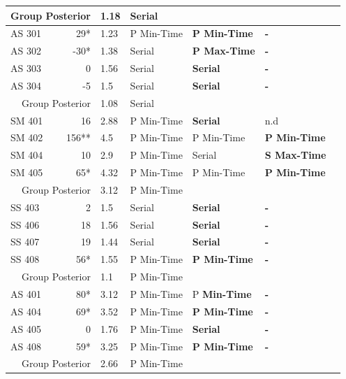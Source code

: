 \begin{table}[!htb]
\begin{tabular*}{\textwidth}{l @{\extracolsep{\fill}} rlllll}
\multicolumn{2}{r}{Group Posterior} & 1.18 & Serial & ~ & ~ \\
\hline
AS 301  & 29*  & 1.23 & P Min-Time  & \textbf{P Min-Time} & \textbf{ - } \\
AS 302  & -30* & 1.38 & Serial  & \textbf{P Max-Time} & \textbf{ - } \\
AS 303  & 0  & 1.56 & Serial  & \textbf{Serial} & \textbf{ - } \\
AS 304  & -5  & 1.5 & Serial  & \textbf{Serial} & \textbf{ - } \\
\multicolumn{2}{r}{Group Posterior} & 1.08 & Serial & ~ & ~ \\
\hline
SM 401  & 16  & 2.88 & P Min-Time  & \textbf{Serial} & n.d \\
SM 402  & 156**  & 4.5 & P Min-Time  & P Min-Time & \textbf{P Min-Time} \\
SM 404  & 10  & 2.9 & P Min-Time  & Serial & \textbf{S Max-Time} \\
SM 405  & 65*  & 4.32 & P Min-Time  & P Min-Time & \textbf{P Min-Time} \\
\multicolumn{2}{r}{Group Posterior} & 3.12 & P Min-Time & ~ & ~\\
\hline
SS 403  & 2  & 1.5 & Serial  & \textbf{Serial} & \textbf{ - } \\
SS 406  & 18  & 1.56 & Serial  & \textbf{Serial} & \textbf{ - } \\
SS 407  & 19  & 1.44 & Serial  & \textbf{Serial} & \textbf{ - } \\
SS 408  & 56*  & 1.55 & P Min-Time  & \textbf{P Min-Time} & \textbf{ - } \\
\multicolumn{2}{r}{Group Posterior} & 1.1 & P Min-Time & ~ & ~\\
\hline
AS 401  & 80*  & 3.12 & P Min-Time  & P \textbf{Min-Time} & \textbf{ - } \\
AS 404  & 69*  & 3.52 & P Min-Time  & \textbf{P Min-Time} & \textbf{ - } \\
AS 405  & 0  & 1.76 & P Min-Time  & \textbf{Serial} & \textbf{ - } \\
AS 408  & 59*  & 3.25 & P Min-Time  & \textbf{P Min-Time} & \textbf{ - } \\
\multicolumn{2}{r}{Group Posterior} & 2.66 & P Min-Time & ~ & ~\\
\hline \hline
\end{tabular*} 
\label{tab:subArch} 
\end{table}

\color{black}

